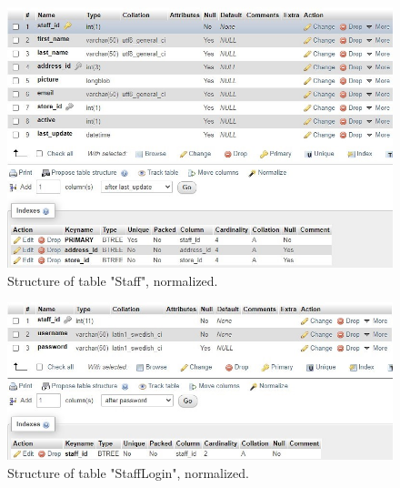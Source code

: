 \documentclass[openany]{article}
\begin{document}
		\begin{figure}[H]
			\includegraphics[width=\textwidth]{table_staff_nstruct}
			\caption{Structure of table "Staff", normalized.}
		\end{figure}
		\begin{figure}[H]
			\includegraphics[width=\textwidth]{table_stafflogin_nstruct}
			\caption{Structure of table "Staff\textunderscore Login", normalized.}
		\end{figure}
	
\end{document}
